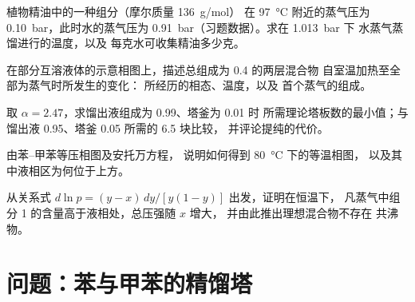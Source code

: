 \begin{exercise}[$\star\star$]\label{exo:b2:liquid-vapour-diagrams:8}
植物精油中的一种组分（摩尔质量 \qty{136}{g/mol}）
在 \qty{97}{\degreeCelsius} 附近的蒸气压为 \qty{0.10}{bar}，此时水的蒸气压为
\qty{0.91}{bar}（习题数据）。求在 \qty{1.013}{bar} 下
水蒸气蒸馏进行的温度，以及
每克水可收集精油多少克。
\end{exercise}

\begin{exercise}[$\star\star$]\label{exo:b2:liquid-vapour-diagrams:9}
在部分互溶液体的示意相图上，描述总组成为 0.4 的两层混合物
自室温加热至全部为蒸气时所发生的变化：
所经历的相态、温度，以及
首个蒸气的组成。
\end{exercise}

\begin{exercise}[$\star\star\star$]\label{exo:b2:liquid-vapour-diagrams:10}
取 $\alpha = 2.47$，求馏出液组成为 0.99、塔釜为 0.01 时
所需理论塔板数的最小值；与馏出液 0.95、塔釜 0.05 所需的 6.5 块比较，
并评论提纯的代价。
\end{exercise}

\begin{exercise}[$\star\star\star$]\label{exo:b2:liquid-vapour-diagrams:11}
由苯–甲苯等压相图及安托万方程，
说明如何得到 \qty{80}{\degreeCelsius} 下的等温相图，
以及其中液相区为何位于上方。
\end{exercise}

\begin{exercise}[$\star\star\star$]\label{exo:b2:liquid-vapour-diagrams:12}
从关系式 $d\ln p = (y - x)\,dy/[y(1 - y)]$ 出发，证明在恒温下，
凡蒸气中组分 1 的含量高于液相处，总压强随 $x$ 增大，
并由此推出理想混合物不存在
共沸物。
\end{exercise}

\section{问题：苯与甲苯的精馏塔}

